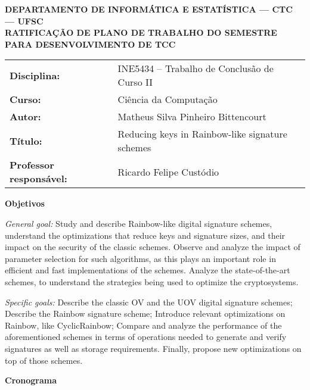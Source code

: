 \documentclass[11pt]{letter}
\begin{document}
\pagestyle{empty}

\begin{center}
\textbf{
	DEPARTAMENTO DE INFORMÁTICA E ESTATÍSTICA --- CTC --- UFSC \\
	RATIFICAÇÃO DE PLANO DE TRABALHO DO SEMESTRE PARA DESENVOLVIMENTO DE TCC
}
\end{center}

\vspace{1em}
\setlength\extrarowheight{5pt}
\begin{tabular}{l l}
	\textbf{Disciplina:} & INE5434 -- Trabalho de Conclusão de Curso II     \\
	\textbf{Curso:}      & Ciência da Computação                            \\
	\textbf{Autor:}      & Matheus Silva Pinheiro Bittencourt               \\
	\textbf{Título:}     & Reducing keys in Rainbow-like signature schemes  \\
	\textbf{Professor responsável:} & Ricardo Felipe Custódio               \\
\end{tabular}


\vspace{1em}
{\large \textbf{Objetivos}}

\textit{General goal:} Study and describe Rainbow-like digital signature
schemes, understand the optimizations that reduce keys and signature sizes, and
their impact on the security of the classic schemes. Observe and analyze the
impact of parameter selection for such algorithms, as this plays an important
role in efficient and fast implementations of the schemes. Analyze the
state-of-the-art schemes, to understand the strategies being used to optimize
the cryptosystems.

\textit{Specific goals:} Describe the classic OV and the UOV digital signature
schemes; Describe the Rainbow signature scheme; Introduce relevant
optimizations on Rainbow, like CyclicRainbow; Compare and analyze the
performance of the aforementioned schemes in terms of operations needed to
generate and verify signatures as well as storage requirements. Finally,
propose new optimizations on top of those schemes.

\vspace{1em}
{\large \textbf{Cronograma}}
\end{document}
